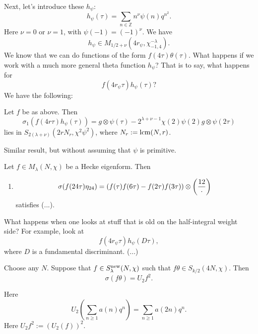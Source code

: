 \documentclass[reqno]{amsart} 
\begin{document}
Next, let's introduce these $h_\psi$:
\begin{equation*}
h_\psi (\tau) = \sum_{n \in \mathbb{Z} } n^\nu \psi (n) q^{n^2 }.
\end{equation*}
Here $\nu = 0$ or $\nu = 1$, with $\psi (-1) = (-1)^{\nu}$.  We have
\begin{equation*}
h_\psi \in M_{1/2 + \nu } (4 r_{\psi}, \chi_{- 1, 4}^{-\lambda}).
\end{equation*}
We know that we can do functions of the form $f (4 \tau ) \theta (\tau) $.  What happens if we work with a much more general theta function $h_\psi$?  That is to say, what happens for
\begin{equation*}
  f (4 r_\psi \tau ) h_\psi (\tau )?
\end{equation*}
We have the following:
\begin{theorem}[Cipra, 1987]
  Let $f$ be as above.  Then
  \begin{equation*}
    \sigma_1 (f (4 r \tau ) h_\psi (\tau) )
    = g \otimes \psi (\tau )
    - 2^{\lambda + \nu - 1 } \chi (2) \psi (2) g \otimes \psi (2 \tau )
  \end{equation*}
  lies in $S_{2 (\lambda + \nu )} (2 r N_r, \chi^2 \psi^2 )$, where $ N _r := \operatorname{lcm} (N, r)$.
\end{theorem}

\begin{theorem}
  Similar result, but without assuming that $\psi$ is primitive.
\end{theorem}

\begin{theorem}[Brown, 2013]
  Let $f \in M_\lambda (N, \chi )$ be a Hecke eigenform.  Then
  \begin{enumerate}
\item
  \begin{equation*}
    \sigma (f (24 \tau ) \eta_{2 4})
    = (f (\tau) f (6 \tau ) - f (2 \tau ) f (3 \tau ))
\otimes \left( \frac{12}{\cdot } \right)
\end{equation*}
satisfies (...).
\end{enumerate}
\end{theorem}

What happens when one looks at stuff that is old on the half-integral weight side?  For example, look at
\begin{equation*}
f (4 r_\psi \tau ) h_\psi (D \tau),
\end{equation*}
where $D$ is a fundamental discriminant.  (...)


\begin{theorem}[B. 2022]
Choose any $N$.  Suppose that $f \in S_\lambda^{\operatorname{new}} (N, \chi )$ such that $f \theta \in S_{k / 2} (4 N, \chi )$.  Then
  \begin{equation*}
\sigma (f \theta ) = U_2 f^2.
\end{equation*}
\end{theorem}
Here
\begin{equation*}
  U_2 (\sum_{n \geq 1} a (n ) q^{n})
  =
  \sum_{n \geq 1}
  a (2 n ) q^n.
\end{equation*}
Here $U_2 f^2 := (U_2(f))^2$.
\end{document}
